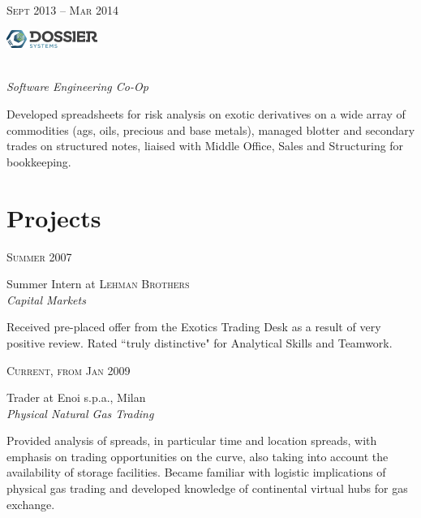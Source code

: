 \documentclass[10pt]{article}
\begin{document}
{\begin{minipage}[t]{0.5\textwidth}

{\raggedleft\textsc{Sept 2013 -- Mar 2014}\par}

\includegraphics[height=0.6cm]{dossier}
{\raggedright\large\\
\textit{Software Engineering Co-Op}\\[5pt]}

\normalsize{Developed spreadsheets for risk analysis on exotic derivatives on a wide array of commodities (ags, oils, precious and base metals), managed blotter and secondary trades on structured notes, liaised with Middle Office, Sales and Structuring for bookkeeping.}\\

\section{Projects} 


{\raggedleft\textsc{Summer 2007}\par}

{\raggedright\large Summer Intern at \textsc{Lehman Brothers}\\
\textit{Capital Markets}\\[5pt]}

\normalsize{Received pre-placed offer from the Exotics Trading Desk as a result of very positive review. Rated ``truly distinctive" for Analytical Skills and Teamwork.}\\


{\raggedleft\textsc{Current, from Jan 2009}\par}

{\raggedright\large Trader at Enoi s.p.a., Milan\\
\textit{Physical Natural Gas Trading}\\[5pt]}

\normalsize{Provided analysis of spreads, in particular time and location spreads, with emphasis on trading opportunities on the curve, also taking into account the availability of storage facilities. Became familiar with logistic implications of physical gas trading and developed knowledge of continental virtual hubs for gas exchange.}\\


\end{minipage}}
\end{document}
